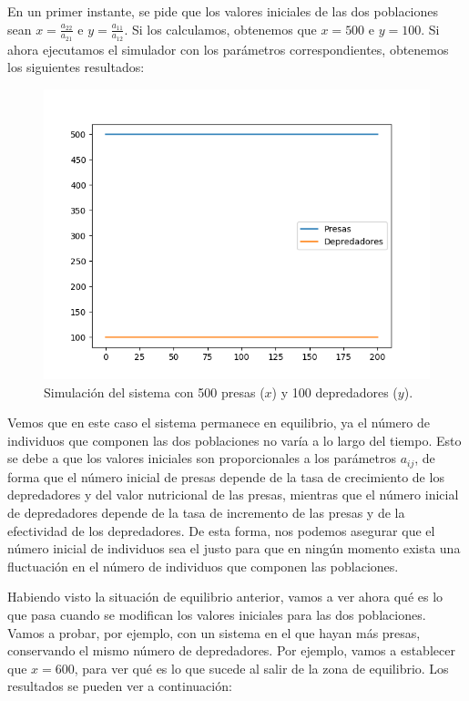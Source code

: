 \documentclass[11pt,a4paper]{article}
\begin{document}
En un primer instante, se pide que los valores iniciales de las dos poblaciones
sean $x = \frac{a_{22}}{a_{21}}$ e $y = \frac{a_{11}}{a_{12}}$. Si los calculamos,
obtenemos que $x = 500$ e $y = 100$. Si ahora ejecutamos el simulador con los parámetros
correspondientes, obtenemos los siguientes resultados:

\begin{figure}[H]
	\centering
	\includegraphics[scale=0.6]{img/x500y100}
	\caption{Simulación del sistema con 500 presas ($x$) y 100 depredadores ($y$).}
\end{figure}

Vemos que en este caso el sistema permanece en equilibrio, ya el número de individuos
que componen las dos poblaciones no varía a lo largo del tiempo. Esto se debe a que
los valores iniciales son proporcionales a los parámetros $a_{ij}$, de forma que
el número inicial de presas depende de la tasa de crecimiento de los depredadores
y del valor nutricional de las presas, mientras que el número inicial de depredadores
depende de la tasa de incremento de las presas y de la efectividad de los depredadores.
De esta forma, nos podemos asegurar que el número inicial de individuos sea el justo para
que en ningún momento exista una fluctuación en el número de individuos que componen las
poblaciones.

Habiendo visto la situación de equilibrio anterior, vamos a ver ahora qué es lo que pasa
cuando se modifican los valores iniciales para las dos poblaciones. Vamos a probar, por ejemplo,
con un sistema en el que hayan más presas, conservando el mismo número de depredadores.
Por ejemplo, vamos a establecer que $x = 600$, para ver qué es lo que sucede al salir de la
zona de equilibrio. Los resultados se pueden ver a continuación:
\end{document}
